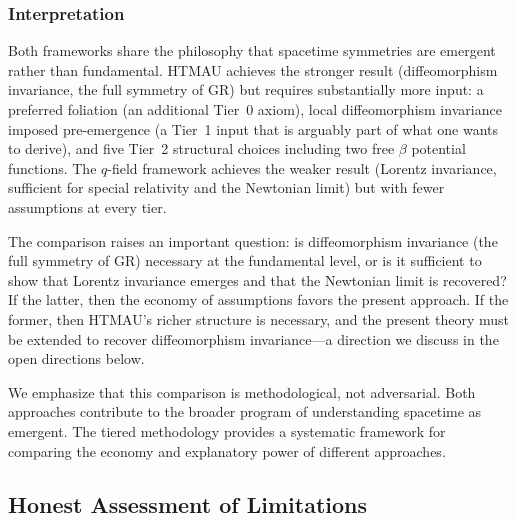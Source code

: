 \documentclass[aps,prd,twocolumn,showpacs,superscriptaddress,preprintnumbers]{revtex4-2}
\begin{document}
\subsubsection{Interpretation}

Both frameworks share the philosophy that spacetime symmetries are emergent rather than fundamental.
HTMAU achieves the stronger result (diffeomorphism invariance, the full symmetry of GR) but requires substantially more input: a preferred foliation (an additional Tier~0 axiom), local diffeomorphism invariance imposed pre-emergence (a Tier~1 input that is arguably part of what one wants to derive), and five Tier~2 structural choices including two free $\beta$ potential functions.
The $q$-field framework achieves the weaker result (Lorentz invariance, sufficient for special relativity and the Newtonian limit) but with fewer assumptions at every tier.

The comparison raises an important question: is diffeomorphism invariance (the full symmetry of GR) necessary at the fundamental level, or is it sufficient to show that Lorentz invariance emerges and that the Newtonian limit is recovered?
If the latter, then the economy of assumptions favors the present approach.
If the former, then HTMAU's richer structure is necessary, and the present theory must be extended to recover diffeomorphism invariance---a direction we discuss in the open directions below.

We emphasize that this comparison is methodological, not adversarial.
Both approaches contribute to the broader program of understanding spacetime as emergent.
The tiered methodology provides a systematic framework for comparing the economy and explanatory power of different approaches.

\subsection{Honest Assessment of Limitations}
\end{document}
